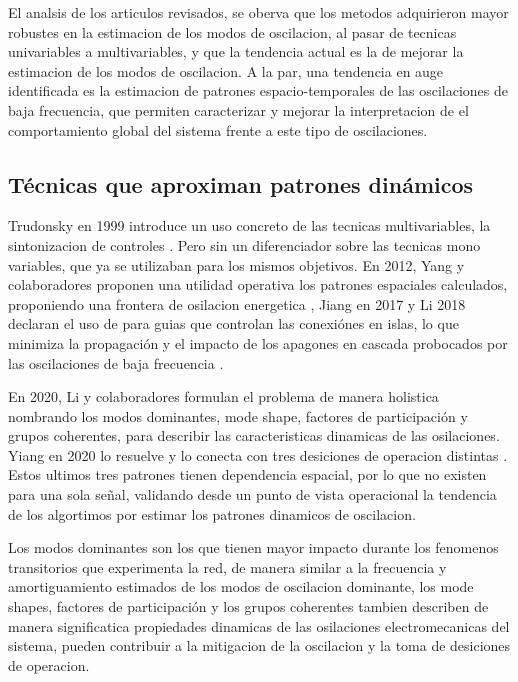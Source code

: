 El analsis de los articulos revisados, se oberva que los metodos adquirieron mayor robustes en la estimacion de 
los modos de oscilacion, al pasar de tecnicas univariables a multivariables, y que la tendencia actual es
la de mejorar la estimacion de los modos de oscilacion. A la par, una tendencia en auge identificada es la estimacion 
de patrones espacio-temporales de las oscilaciones de baja frecuencia, que permiten caracterizar y mejorar
la interpretacion de el comportamiento global del sistema frente a este tipo de oscilaciones. 

\subsection{Técnicas que aproximan patrones dinámicos}

Trudonsky en 1999 introduce un uso concreto de las tecnicas multivariables, la sintonizacion de controles 
\cite{Trudnowski1999}. Pero sin un diferenciador sobre las tecnicas mono variables, que ya se 
utilizaban para los mismos objetivos. En 2012, Yang y colaboradores proponen una utilidad operativa los 
patrones espaciales calculados, proponiendo una frontera de osilacion energetica \cite{Yang2012}, Jiang en 2017 
y Li 2018 declaran el uso de para guias que controlan las conexiónes en islas, lo que minimiza la propagación 
y el impacto de los apagones en cascada probocados por las oscilaciones de baja frecuencia \cite{Jiang2017, Li2018}.

En 2020, Li y colaboradores formulan el problema de manera holistica \cite{li2020era} nombrando los modos 
dominantes, mode shape, factores de participación y grupos coherentes, para describir las caracteristicas
dinamicas de las osilaciones. Yiang en 2020 lo resuelve y lo conecta con tres desiciones de operacion distintas 
\cite{jiang2021}. Estos ultimos tres patrones tienen dependencia espacial, por lo que no existen
para una sola señal, validando desde un punto de vista operacional la tendencia de los algortimos por estimar
los patrones dinamicos de oscilacion.

Los modos dominantes son los que tienen mayor impacto durante los fenomenos transitorios que experimenta la red, 
de manera similar a la frecuencia y amortiguamiento estimados de los modos de oscilacion dominante, los mode shapes,
factores de participación y los grupos coherentes tambien describen de manera significatica propiedades dinamicas
de las osilaciones electromecanicas del sistema, pueden contribuir a la mitigacion de la oscilacion y la toma de 
desiciones de operacion. 

